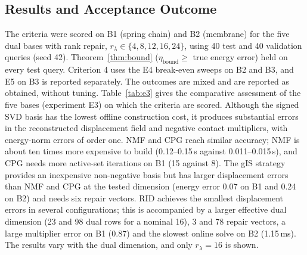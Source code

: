\documentclass[11pt,a4paper]{article}
\begin{document}
\hypertarget{results-and-acceptance-outcome}{%
\subsection{Results and Acceptance Outcome}\label{results-and-acceptance-outcome}}

The criteria were scored on B1 (spring chain) and B2 (membrane) for the five dual bases with rank repair, \(r_\lambda \in \{4,8,12,16,24\}\), using 40 test and 40 validation queries (seed 42). Theorem~\ref{thm:bound} (\(\eta_{\text{bound}} \ge\) true energy error) held on every test query. Criterion 4 uses the E4 break-even sweeps on B2 and B3, and E5 on B3 is reported separately. The outcomes are mixed and are reported as obtained, without tuning. Table~\ref{tab:e3} gives the comparative assessment of the five bases (experiment E3) on which the criteria are scored. Although the signed SVD basis has the lowest offline construction cost, it produces substantial errors in the reconstructed displacement field and negative contact multipliers, with energy-norm errors of order one. NMF and CPG reach similar accuracy; NMF is about ten times more expensive to build (0.12--0.15\,s against 0.011--0.015\,s), and CPG needs more active-set iterations on B1 (15 against 8). The gIS strategy provides an inexpensive non-negative basis but has larger displacement errors than NMF and CPG at the tested dimension (energy error 0.07 on B1 and 0.24 on B2) and needs six repair vectors. RID achieves the smallest displacement errors in several configurations; this is accompanied by a larger effective dual dimension (23 and 98 dual rows for a nominal 16), 3 and 78 repair vectors, a large multiplier error on B1 (0.87) and the slowest online solve on B2 (1.15\,ms). The results vary with the dual dimension, and only \(r_\lambda=16\) is shown.
\end{document}
